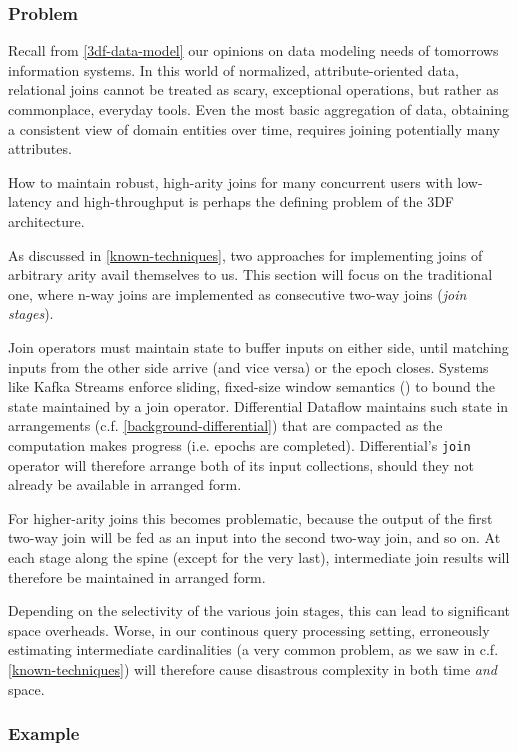 \documentclass[../catalog.tex]{subfiles}
\begin{document}
\subsubsection{Problem}

Recall from \ref{3df-data-model} our opinions on data modeling needs
of tomorrows information systems. In this world of normalized,
attribute-oriented data, relational joins cannot be treated as scary,
exceptional operations, but rather as commonplace, everyday
tools. Even the most basic aggregation of data, obtaining a consistent
view of domain entities over time, requires joining potentially many
attributes.

How to maintain robust, high-arity joins for many concurrent users
with low-latency and high-throughput is perhaps the defining problem
of the 3DF architecture.

As discussed in \ref{known-techniques}, two approaches for
implementing joins of arbitrary arity avail themselves to us. This
section will focus on the traditional one, where n-way joins are
implemented as consecutive two-way joins (\emph{join stages}).

Join operators must maintain state to buffer inputs on either side,
until matching inputs from the other side arrive (and vice versa) or
the epoch closes. Systems like Kafka Streams enforce sliding,
fixed-size window semantics (\cite{kafkadocs}) to bound the state
maintained by a join operator. Differential Dataflow maintains such
state in arrangements (c.f. \ref{background-differential}) that are
compacted as the computation makes progress (i.e. epochs are
completed). Differential's \texttt{join} operator will therefore
arrange both of its input collections, should they not already be
available in arranged form.

For higher-arity joins this becomes problematic, because the output of
the first two-way join will be fed as an input into the second two-way
join, and so on. At each stage along the spine (except for the very
last), intermediate join results will therefore be maintained in
arranged form.

Depending on the selectivity of the various join stages, this can lead
to significant space overheads. Worse, in our continous query
processing setting, erroneously estimating intermediate cardinalities
(a very common problem, as we saw in c.f. \ref{known-techniques}) will
therefore cause disastrous complexity in both time \emph{and} space.

\subsubsection{Example}
\end{document}
